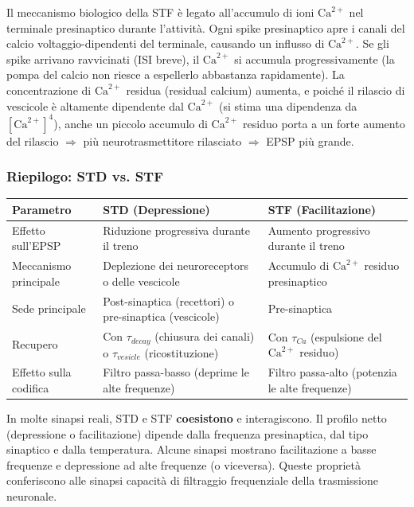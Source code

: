 Il meccanismo biologico della STF è legato all'accumulo di ioni $\text{Ca}^{2+}$ nel terminale presinaptico durante l'attività. Ogni spike presinaptico apre i canali del calcio voltaggio-dipendenti del terminale, causando un influsso di $\text{Ca}^{2+}$. Se gli spike arrivano ravvicinati (ISI breve), il $\text{Ca}^{2+}$ si accumula progressivamente (la pompa del calcio non riesce a espellerlo abbastanza rapidamente). La concentrazione di $\text{Ca}^{2+}$ residua (residual calcium) aumenta, e poiché il rilascio di vescicole è altamente dipendente dal $\text{Ca}^{2+}$ (si stima una dipendenza da $[\text{Ca}^{2+}]^4$), anche un piccolo accumulo di $\text{Ca}^{2+}$ residuo porta a un forte aumento del rilascio $\Rightarrow$ più neurotrasmettitore rilasciato $\Rightarrow$ EPSP più grande.

\subsubsection{Riepilogo: STD vs. STF}

\begin{table}[htbp]
    \centering
    \renewcommand{\arraystretch}{1.3}
    \begin{tabularx}{\textwidth}{|>{\raggedright\arraybackslash}p{3cm}|X|X|}
    \hline
    \textbf{Parametro} & \textbf{STD (Depressione)} & \textbf{STF (Facilitazione)} \\
    \hline
    Effetto sull'EPSP & Riduzione progressiva durante il treno & Aumento progressivo durante il treno \\
    \hline
    Meccanismo principale & Deplezione dei neuroreceptors o delle vescicole & Accumulo di $\text{Ca}^{2+}$ residuo presinaptico \\
    \hline
    Sede principale & Post-sinaptica (recettori) o pre-sinaptica (vescicole) & Pre-sinaptica \\
    \hline
    Recupero & Con $\tau_{decay}$ (chiusura dei canali) o $\tau_{vesicle}$ (ricostituzione) & Con $\tau_{Ca}$ (espulsione del $\text{Ca}^{2+}$ residuo) \\
    \hline
    Effetto sulla codifica & Filtro passa-basso (deprime le alte frequenze) & Filtro passa-alto (potenzia le alte frequenze) \\
    \hline
    \end{tabularx}
\end{table}

\begin{tcolorbox}[colback=gray!5, colframe=gray!40, arc=2mm, boxrule=0.5pt]
In molte sinapsi reali, STD e STF \textbf{coesistono} e interagiscono. Il profilo netto (depressione o facilitazione) dipende dalla frequenza presinaptica, dal tipo sinaptico e dalla temperatura. Alcune sinapsi mostrano facilitazione a basse frequenze e depressione ad alte frequenze (o viceversa). Queste proprietà conferiscono alle sinapsi capacità di filtraggio frequenziale della trasmissione neuronale.
\end{tcolorbox}

